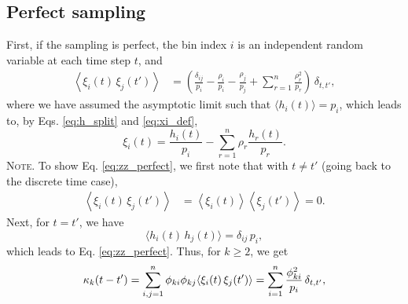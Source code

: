 \documentclass[reprint, floatfix]{revtex4-1}
\newcommand{\note}[1]{{\color{DarkGreen}\footnotesize \textsc{Note.} #1}}
\begin{document}
\subsection{\label{sec:Gamma_perfect}
Perfect sampling}


First, if the sampling is perfect,
%
%
the bin index $i$ is an independent random variable
at each time step $t$, and
%
\begin{align}
  \left\langle
    \xi_i(t) \, \xi_j(t')
  \right\rangle
  &=
  \left(
    \frac{ \delta_{ij} } { p_i }
    -
    \frac{ \rho_i } { p_i }
    -
    \frac{ \rho_j } { p_j }
    +
    \sum_{r = 1}^n
    \frac{ \rho_r^2 } { p_r }
  \right) \,
  \delta_{t, t'}
  ,
\label{eq:zz_perfect}
\end{align}
%
where
we have assumed the asymptotic limit
such that $\langle h_i(t) \rangle = p_i$,
which leads to,
by Eqs. \eqref{eq:h_split} and \eqref{eq:xi_def},
$$
  \xi_i(t)
  =
  \frac{ h_i(t) } { p_i }
  -
  \sum_{ r = 1 }^n
    \rho_r \frac{ h_r(t) } { p_r }
  .
$$
%
\note{To show Eq. \eqref{eq:zz_perfect}, we first note that
  with $t \ne t'$ (going back to the discrete time case),
  $$
  \begin{aligned}
  \left\langle
    \xi_i(t) \, \xi_j(t')
  \right\rangle
  &=
  \left\langle
    \xi_i(t)
  \right\rangle
  \left\langle
    \xi_j(t')
  \right\rangle
  =
  0.
  \end{aligned}
  $$
  Next, for $t = t'$, we have
  $$
  \langle
    h_i(t) \, h_j(t)
  \rangle
  = \delta_{ij} \, p_i
  ,
  $$
  which leads to Eq. \eqref{eq:zz_perfect}.
}
%
Thus,
for $k \ge 2$, we get
%
\begin{equation}
  \kappa_k(t - t')
  =
  \sum_{i,j = 1}^n
  \phi_{ki} \phi_{kj}
  \langle \xi_i(t) \, \xi_j(t') \rangle
  =
  \sum_{i = 1}^n \frac{ \phi_{ki}^2 } { p_i }
  \, \delta_{t, t'},
\notag
\end{equation}
\end{document}
